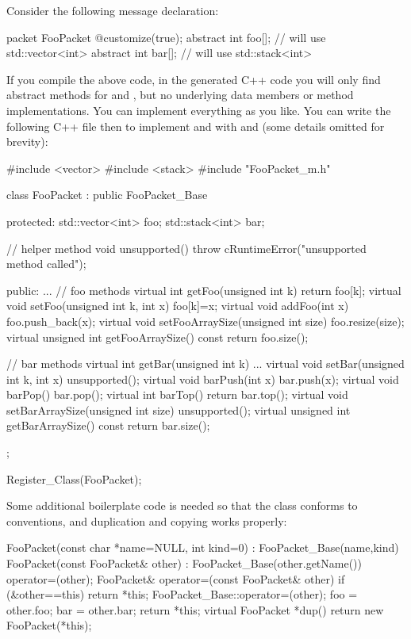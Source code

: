 Consider the following message declaration:

\begin{msg}
packet FooPacket
{
    @customize(true);
    abstract int foo[]; // will use std::vector<int>
    abstract int bar[]; // will use std::stack<int>
}
\end{msg}

If you compile the above code, in the generated C++ code you will only find
abstract methods for  and , but no underlying data
members or method implementations. You can implement everything as you
like. You can write the following C++ file then to implement  and
 with  and  (some details omitted
for brevity):

\begin{cpp}
#include <vector>
#include <stack>
#include "FooPacket_m.h"

class FooPacket : public FooPacket_Base
{
  protected:
    std::vector<int> foo;
    std::stack<int> bar;

    // helper method
    void unsupported() {throw cRuntimeError("unsupported method called");}

  public:
    ...
    // foo methods
    virtual int getFoo(unsigned int k) {return foo[k];}
    virtual void setFoo(unsigned int k, int x) {foo[k]=x;}
    virtual void addFoo(int x) {foo.push_back(x);}
    virtual void setFooArraySize(unsigned int size) {foo.resize(size);}
    virtual unsigned int getFooArraySize() const {return foo.size();}

    // bar methods
    virtual int getBar(unsigned int k) {...}
    virtual void setBar(unsigned int k, int x) {unsupported();}
    virtual void barPush(int x) {bar.push(x);}
    virtual void barPop() {bar.pop();}
    virtual int barTop() {return bar.top();}
    virtual void setBarArraySize(unsigned int size) {unsupported();}
    virtual unsigned int getBarArraySize() const {return bar.size();}
};

Register_Class(FooPacket);
\end{cpp}

Some additional boilerplate code is needed so that the class conforms
to conventions, and duplication and copying works properly:

\begin{cpp}
    FooPacket(const char *name=NULL, int kind=0) : FooPacket_Base(name,kind) {
    }
    FooPacket(const FooPacket& other) : FooPacket_Base(other.getName()) {
        operator=(other);
    }
    FooPacket& operator=(const FooPacket& other) {
        if (&other==this) return *this;
        FooPacket_Base::operator=(other);
        foo = other.foo;
        bar = other.bar;
        return *this;
    }
    virtual FooPacket *dup() {
        return new FooPacket(*this);
    }
\end{cpp}

